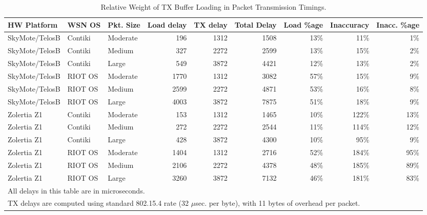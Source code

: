 \documentclass[10pt,final,journal,twocolumn]{IEEEtran}
\begin{document}
\begin{table*}[htbp]
\caption{Relative Weight of TX Buffer Loading in Packet Transmission Timings.}
\label{TblTXRelWeight}
\centering

\begin{tabular}{l|l|l|rrr|r|r|r}
\hline
HW Platform & WSN OS  & Pkt. Size
                  & Load delay & TX delay & Total Delay & Load \%age
                  & Inaccuracy & Inacc. \%age \\
\hline
SkyMote/TelosB    & Contiki & Moderate
                  &   196      & 1312     & 1508        & 13\%
                  &  11\%      &  1\% \\
SkyMote/TelosB    & Contiki & Medium
                  &   327      & 2272     & 2599        & 13\%
                  &  15\%      &  2\% \\
SkyMote/TelosB    & Contiki & Large
                  &   549      & 3872     & 4421        & 12\%
                  &  13\%      &  2\% \\
\hline
SkyMote/TelosB    & RIOT OS & Moderate
                  &  1770      & 1312     & 3082        & 57\%
                  &  15\%      &  9\% \\
SkyMote/TelosB    & RIOT OS & Medium
                  &  2599      & 2272     & 4871        & 53\%
                  &  16\%      &  8\% \\
SkyMote/TelosB    & RIOT OS & Large
                  &  4003      & 3872     & 7875        & 51\%
                  &  18\%      &  9\% \\
\hline
Zolertia Z1       & Contiki & Moderate
                  &   153      & 1312     & 1465        & 10\%
                  & 122\%      & 13\% \\
Zolertia Z1       & Contiki & Medium
                  &   272      & 2272     & 2544        & 11\%
                  & 114\%      & 12\% \\
Zolertia Z1       & Contiki & Large
                  &   428      & 3872     & 4300        & 10\%
                  &  95\%      &  9\% \\
\hline
Zolertia Z1       & RIOT OS & Moderate
                  &  1404      & 1312     & 2716        & 52\%
                  & 184\%      & 95\% \\
Zolertia Z1       & RIOT OS & Medium
                  &  2106   & 2272        & 4378        & 48\%
                  & 185\%      & 89\% \\
Zolertia Z1       & RIOT OS & Large
                  &  3260   & 3872        & 7132        & 46\%
                  & 181\%      & 83\% \\
\hline
\multicolumn{9}{l}{All delays in this table are in microseconds.}\\
\multicolumn{9}{l}{TX delays are computed using standard 802.15.4 rate
(32 $\mu$sec. per byte), with 11 bytes of overhead per packet.}\\
\end{tabular}
\end{table*}
\end{document}
